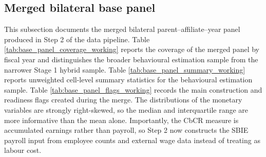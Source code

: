 \subsection{Merged bilateral base panel}\label{sec:base_panel_appendix}

This subsection documents the merged bilateral parent--affiliate--year panel produced in Step 2 of the data pipeline. Table \ref{tab:base_panel_coverage_working} reports the coverage of the merged panel by fiscal year and distinguishes the broader behavioural estimation sample from the narrower Stage 1 hybrid sample. Table \ref{tab:base_panel_summary_working} reports unweighted cell-level summary statistics for the behavioural estimation sample. Table \ref{tab:base_panel_flags_working} records the main construction and readiness flags created during the merge. The distributions of the monetary variables are strongly right-skewed, so the median and interquartile range are more informative than the mean alone. Importantly, the CbCR  measure is accumulated earnings rather than payroll, so Step 2 now constructs the SBIE payroll input from employee counts and external wage data instead of treating  as labour cost.

